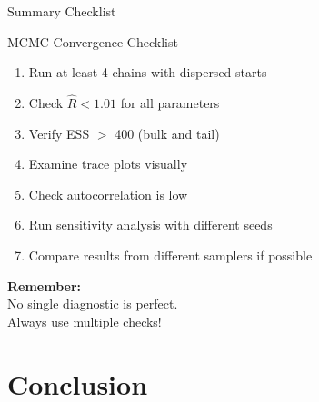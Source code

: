 \begin{frame}{Summary Checklist}
	\begin{block}{MCMC Convergence Checklist}
		\begin{enumerate}
			\item Run at least 4 chains with dispersed starts
			\item Check $\hat{R} < 1.01$ for all parameters
			\item Verify ESS $>$ 400 (bulk and tail)
			\item Examine trace plots visually
			\item Check autocorrelation is low
			\item Run sensitivity analysis with different seeds
			\item Compare results from different samplers if possible
		\end{enumerate}
	\end{block}

	\vspace{0.5cm}
	\begin{center}
		\Large
		\textbf{Remember:}\\
		\vspace{0.3cm}
		\color{copenhagenred} No single diagnostic is perfect.\\
		Always use multiple checks!
	\end{center}
\end{frame}

\section{Conclusion}

